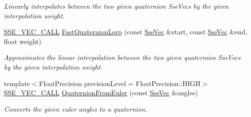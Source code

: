 \begin{DoxyCompactItemize}
\begin{DoxyCompactList}\small\item\em Linearly interpolates between the two given quaternion Sse\+Vecs by the given interpolation weight. \end{DoxyCompactList}\item 
\hyperlink{ssevec__math__defs_8h_a97454f977a5281455cecacce1e8ba670}{S\+S\+E\+\_\+\+V\+E\+C\+\_\+\+C\+A\+L\+L} \hyperlink{group___s_i_m_d_vec_math_ga8b89bda83472a9ab1142262923b5414c}{Fast\+Quaternion\+Lerp} (const \hyperlink{namespacegfxmath_a0de2243e2b8d0fd46d3af5e036423004}{Sse\+Vec} \&start, const \hyperlink{namespacegfxmath_a0de2243e2b8d0fd46d3af5e036423004}{Sse\+Vec} \&end, float weight)
\begin{DoxyCompactList}\small\item\em Approximates the linear interpolation between the two given quaternion Sse\+Vecs by the given interpolation weight. \end{DoxyCompactList}\item 
{\footnotesize template$<$Float\+Precision precision\+Level = Float\+Precision\+::\+H\+I\+G\+H$>$ }\\\hyperlink{ssevec__math__defs_8h_a97454f977a5281455cecacce1e8ba670}{S\+S\+E\+\_\+\+V\+E\+C\+\_\+\+C\+A\+L\+L} \hyperlink{group___s_i_m_d_vec_math_ga5b0f97139561eb2dc6b1d994aae7092f}{Quaternion\+From\+Euler} (const \hyperlink{namespacegfxmath_a0de2243e2b8d0fd46d3af5e036423004}{Sse\+Vec} \&angles)
\begin{DoxyCompactList}\small\item\em Converts the given euler angles to a quaternion. \end{DoxyCompactList}\end{DoxyCompactItemize}

